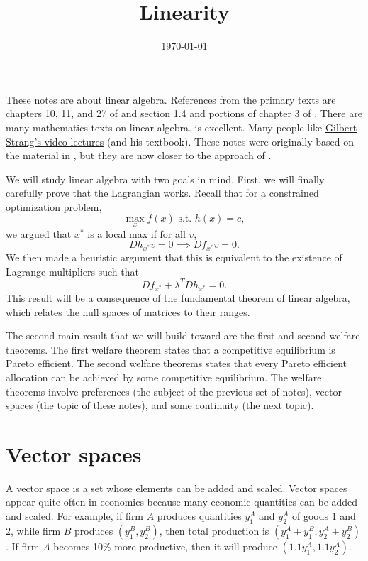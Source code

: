  

\title{Linearity}
\date{\today}



\maketitle

These notes are about linear algebra. References from the primary
texts are chapters 10, 11, and 27 of \cite{sb1994} and section 1.4 and
portions of chapter 3 of \cite{carter2001}. There are many mathematics
texts on linear algebra.  \cite{axler1997} is excellent. Many people
like
\href{http://ocw.mit.edu/courses/mathematics/18-06-linear-algebra-spring-2010/video-lectures/}
{Gilbert Strang's video lectures} (and his textbook). These notes were
originally based on the material in \cite{sb1994}, but they are now
closer to the approach of \cite{axler1997}. 

We will study linear algebra with two goals in mind. First, we will
finally carefully prove that the Lagrangian works. Recall that for a
constrained optimization problem, 
\[ \max_x f(x) \text{ s.t.  } h(x) = c, \]
we argued that $x^*$ is a local max if for all $v$, 
\[ Dh_{x^*} v = 0 \implies Df_{x^*} v = 0. \] 
We then made a heuristic argument that this is equivalent to the
existence of Lagrange multipliers such that 
\[ Df_{x^*} + \lambda^T Dh_{x^*} = 0. \]
This result will be a consequence of the fundamental theorem of linear
algebra, which relates the null spaces of matrices to their ranges. 

The second main result that we will build toward are the first and
second welfare theorems. The first welfare theorem states that a
competitive equilibrium is Pareto efficient. The second welfare
theorems states that every Pareto efficient allocation can be achieved
by some competitive equilibrium. The welfare theorems involve
preferences (the subject of the previous set of notes), vector spaces
(the topic of these notes), and some continuity (the next topic). 

\section{Vector spaces}

A vector space is a set whose elements can be added and scaled. Vector
spaces appear quite often in economics because many economic
quantities can be added and scaled. For example, if firm $A$ produces
quantities $y_1^A$ and $y_2^A$ of goods $1$ and $2$, while firm $B$
produces $(y_1^B,y_2^B)$, then total production is $(y_1^A+y_1^B,
y_2^A+y_2^B)$. If firm $A$ becomes 10\% more productive, then it will
produce $(1.1 y_1^A, 1.1 y_2^A)$.

